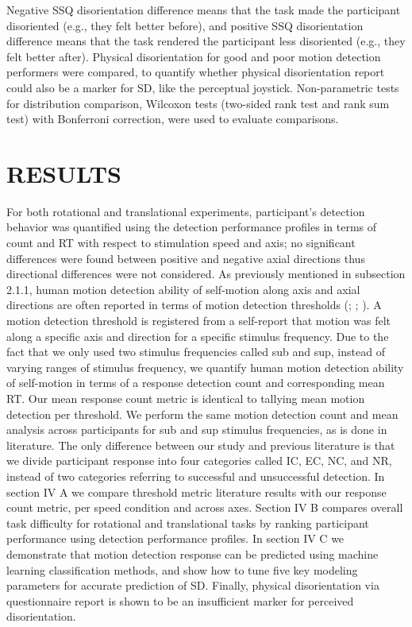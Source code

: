 \documentclass[11pt, onecolumn]{article}
\begin{document}
Negative SSQ disorientation difference means that the task made the participant disoriented (e.g., they felt better before), and positive SSQ disorientation difference means that the task rendered the participant less disoriented (e.g., they felt better after).  Physical disorientation for good and poor motion detection performers were compared, to quantify whether physical disorientation report could also be a marker for SD, like the perceptual joystick.  Non-parametric tests for distribution comparison, Wilcoxon tests (two-sided rank test and rank sum test) with Bonferroni correction, were used to evaluate comparisons.

\section{RESULTS}
For both rotational and translational experiments, participant’s detection behavior was quantified using the detection performance profiles in terms of count and RT with respect to stimulation speed and axis; no significant differences were found between positive and negative axial directions thus directional differences were not considered.  As previously mentioned in subsection 2.1.1, human motion detection ability of self-motion along axis and axial directions are often reported in terms of motion detection thresholds (\cite{Valko_2012_Vestibular}; \cite{Hartmann_2014_Direction}; \cite{Karmali_2017_Multivariate}).  A motion detection threshold is registered from a self-report that motion was felt along a specific axis and direction for a specific stimulus frequency.  Due to the fact that we only used two stimulus frequencies called sub and sup, instead of varying ranges of stimulus frequency, we quantify human motion detection ability of self-motion in terms of a response detection count and corresponding mean RT.  Our mean response count metric is identical to tallying mean motion detection per threshold.  We perform the same motion detection count and mean analysis across participants for sub and sup stimulus frequencies, as is done in literature.  The only difference between our study and previous literature is that we divide participant response into four categories called IC, EC, NC, and NR,  instead of two categories referring to successful and unsuccessful detection.  In section IV A we compare threshold metric literature results with our response count metric, per speed condition and across axes.  Section IV B compares overall task difficulty for rotational and translational tasks by ranking participant performance using detection performance profiles.  In section IV C we demonstrate that motion detection response can be predicted using machine learning classification methods, and show how to tune five key modeling parameters for accurate prediction of SD.  Finally, physical disorientation via questionnaire report is shown to be an insufficient marker for perceived disorientation.
\end{document}
